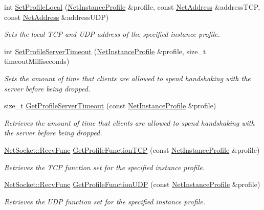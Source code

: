 \begin{DoxyCompactItemize}
int \hyperlink{namespacemn_a93163a023edd6728be16cc372102410e}{SetProfileLocal} (\hyperlink{class_net_instance_profile}{NetInstanceProfile} \&profile, const \hyperlink{class_net_address}{NetAddress} \&addressTCP, const \hyperlink{class_net_address}{NetAddress} \&addressUDP)
\begin{DoxyCompactList}\small\item\em Sets the local TCP and UDP address of the specified instance profile. \item\end{DoxyCompactList}\item 
int \hyperlink{namespacemn_a8efc5de6466f9709510161e20a8375ff}{SetProfileServerTimeout} (\hyperlink{class_net_instance_profile}{NetInstanceProfile} \&profile, size\_\-t timeoutMilliseconds)
\begin{DoxyCompactList}\small\item\em Sets the amount of time that clients are allowed to spend handshaking with the server before being dropped. \item\end{DoxyCompactList}\item 
size\_\-t \hyperlink{namespacemn_a56025854b599712a4787d1e5cd8ce502}{GetProfileServerTimeout} (const \hyperlink{class_net_instance_profile}{NetInstanceProfile} \&profile)
\begin{DoxyCompactList}\small\item\em Retrieves the amount of time that clients are allowed to spend handshaking with the server before being dropped. \item\end{DoxyCompactList}\item 
\hyperlink{class_net_socket_a52b5f4de8d0a47fd8620f542b21c076c}{NetSocket::RecvFunc} \hyperlink{namespacemn_ac2ee4d9e630c70d78f6e1b88aae40f08}{GetProfileFunctionTCP} (const \hyperlink{class_net_instance_profile}{NetInstanceProfile} \&profile)
\begin{DoxyCompactList}\small\item\em Retrieves the TCP function set for the specified instance profile. \item\end{DoxyCompactList}\item 
\hyperlink{class_net_socket_a52b5f4de8d0a47fd8620f542b21c076c}{NetSocket::RecvFunc} \hyperlink{namespacemn_a4a14f8b971fbcb6bf71d8b0b68a3b31c}{GetProfileFunctionUDP} (const \hyperlink{class_net_instance_profile}{NetInstanceProfile} \&profile)
\begin{DoxyCompactList}\small\item\em Retrieves the UDP function set for the specified instance profile. \item\end{DoxyCompactList}\item 

\end{DoxyCompactItemize}

